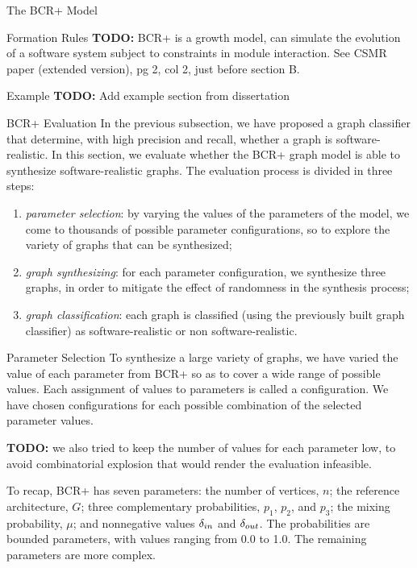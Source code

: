 \documentclass[11pt,twocolumn,a4paper,english]{article}
\newcommand{\TODO}{\textbf{TODO:} }
\begin{document}
\begin{section}{The BCR+ Model}
\begin{subsection}{Formation Rules}
	\TODO BCR+ is a growth model, can simulate the evolution of a software system subject to constraints in module interaction. See CSMR paper (extended version), pg 2, col 2, just before section B. 
	
\end{subsection}

\begin{subsection}{Example}
	\TODO Add example section from dissertation
\end{subsection}
	
\begin{subsection}{BCR+ Evaluation}
	In the previous subsection, we have proposed a graph classifier that determine, with high precision and recall, whether a graph is software-realistic. In this section, we evaluate whether the BCR+ graph model is able to synthesize software-realistic graphs. The evaluation process is divided in three steps:
	
	\begin{enumerate}
		\item \emph{parameter selection}: by varying the values of the parameters of the model, we come to thousands of possible parameter configurations, so to explore the variety of graphs that can be synthesized;
		
		\item \emph{graph synthesizing}: for each parameter configuration, we synthesize three graphs, in order to mitigate the effect of randomness in the synthesis process;
		
		\item \emph{graph classification}: each graph is classified (using the previously built graph classifier) as software-realistic or non software-realistic.
	\end{enumerate}
	
\begin{subsubsection}{Parameter Selection}
	To synthesize a large variety of graphs, we have varied the value of each parameter from BCR+ so as to cover a wide range of possible values. Each assignment of values to parameters is called a configuration. We have chosen configurations for each possible combination of the selected parameter values.
	
	\TODO we also tried to keep the number of values for each parameter low, to avoid combinatorial explosion that would render the evaluation infeasible. 
	
	To recap, BCR+ has seven parameters: the number of vertices, $n$; the reference architecture, $G$; three complementary probabilities, $p_1$, $p_2$, and $p_3$; the mixing probability, $\mu$; and nonnegative values $\delta_{in}$ and $\delta_{out}$. The probabilities are bounded parameters, with values ranging from 0.0 to 1.0. The remaining parameters are more complex.
	

\end{subsubsection}
\end{subsection}
\end{section}
\end{document}
